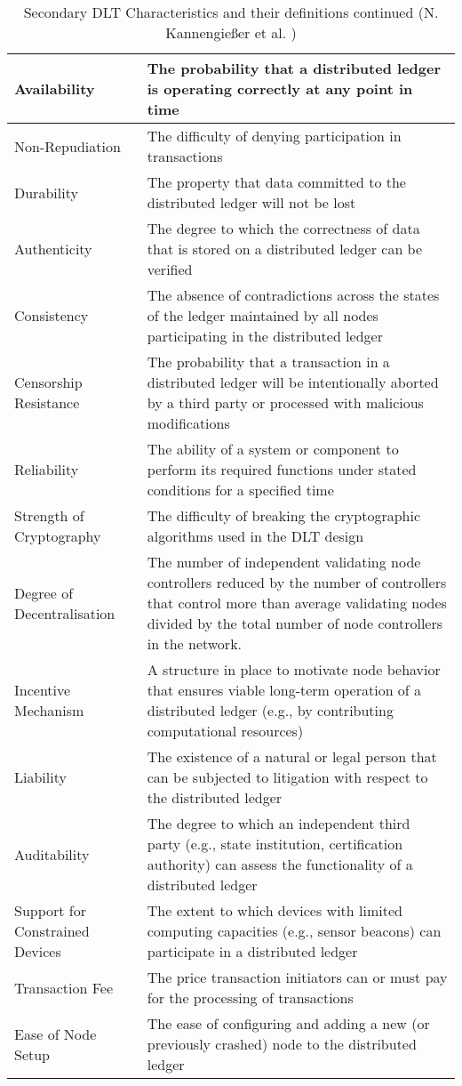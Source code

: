 \begin{table}[H]
    \centering
\caption{Secondary DLT Characteristics and their definitions continued (N. Kannengießer et al. \cite{dlt_4})}
    \label{tab:seconddltcharscontinued}
\begin{tabular}{|m{5cm}|m{10cm}|}
\hline
Availability & The probability that a distributed ledger is operating correctly at any point in time \\ [12pt]\hline
\rule{0pt}{4ex}Non-Repudiation & \rule{0pt}{4ex}The difficulty of denying participation in transactions \\ [12pt]\hline
Durability & The property that data committed to the distributed ledger will not be lost \\ [12pt]\hline
Authenticity & The degree to which the correctness of data that is stored on a distributed ledger can be verified \\ [12pt]\hline
Consistency & The absence of contradictions across the states of the ledger maintained by all nodes participating in the distributed ledger \\ [12pt]\hline
Censorship Resistance & The probability that a transaction in a distributed ledger will be intentionally aborted by a third party or processed with malicious modifications \\ [12pt]\hline
Reliability & The ability of a system or component to perform its required functions under stated conditions for a specified time \\ [12pt]\hline
Strength of Cryptography & The difficulty of breaking the cryptographic algorithms used in the DLT design \\ [12pt]\hline\hline
Degree of Decentralisation & The number of independent validating node controllers reduced by the number of controllers that control more than average validating nodes divided by the total number of node controllers in the network. \\ [12pt]\hline
Incentive Mechanism & A structure in place to motivate node behavior that ensures viable long-term operation of a distributed ledger (e.g., by contributing computational resources) \\ [12pt]\hline
Liability & The existence of a natural or legal person that can be subjected to litigation with respect to the distributed ledger \\ [12pt]\hline
Auditability & The degree to which an independent third party (e.g., state institution, certification authority) can assess the functionality of a distributed ledger \\ [12pt]\hline\hline
Support for \newline Constrained Devices & The extent to which devices with limited computing capacities (e.g., sensor beacons) can participate in a distributed ledger \\ [12pt]\hline
Transaction Fee & The price transaction initiators can or must pay for the processing of transactions \\ [12pt]\hline
Ease of Node Setup & The ease of configuring and adding a new (or previously crashed) node to the distributed ledger \\ [12pt]\hline
\end{tabular}


\end{table}
